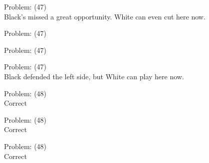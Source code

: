 \documentclass[11pt]{article}
\begin{document}
\begin{minipage}[t]{0.5\textwidth}
  {\centering
  
  Problem: (47)\\
  Black's missed a great opportunity. White can even cut here now.\\
  }
\end{minipage}
\begin{minipage}[t]{0.5\textwidth}
  {\centering
  
  Problem: (47)\\
  
  }
\end{minipage}
\begin{minipage}[t]{0.5\textwidth}
  {\centering
  
  Problem: (47)\\
  
  }
\end{minipage}
\begin{minipage}[t]{0.5\textwidth}
  {\centering
  
  Problem: (47)\\
  Black defended the left side, but White can play here now.\\
  }
\end{minipage}
\begin{minipage}[t]{0.5\textwidth}
  {\centering
  
  Problem: (48)\\
  Correct\\
  }
\end{minipage}
\begin{minipage}[t]{0.5\textwidth}
  {\centering
  
  Problem: (48)\\
  Correct\\
  }
\end{minipage}
\begin{minipage}[t]{0.5\textwidth}
  {\centering
  
  Problem: (48)\\
  Correct\\
  }
\end{minipage}
\end{document}
